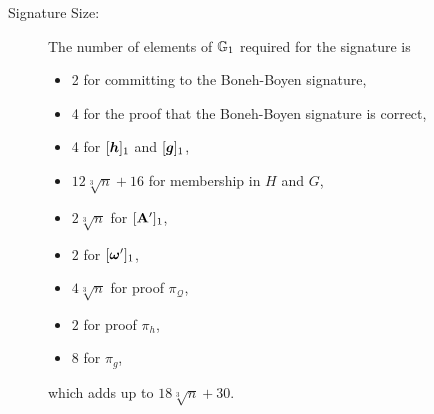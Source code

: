 
\begin{description}
\item[Signature Size:] The number of elements of $\mathbb{G}_1$ required  for the signature is
\begin{itemize}
\item 2 for committing to the Boneh-Boyen signature,
\item 4 for the proof that the Boneh-Boyen signature is correct,
\item 4 for $[{\boldsymbol{h}}]_1$ and $[{\boldsymbol{g}}]_1$,
\item $12\sqrt[3]{n} + 16$ for membership in $H$ and $G$,
\item $2\sqrt[3]{n}$ for $[\mathbf{{A'}}]_1$,
\item $2$ for $[{\boldsymbol{\omega}}']_1$,
\item $4\sqrt[3]{n}$ for proof  $\pi_{\mathcal{Q}}$,
\item $2$ for proof $\pi_h$,
\item $8$ for $\pi_g$,
\end{itemize}
which adds up to $18\sqrt[3]{n} + 30$.


\end{description}
